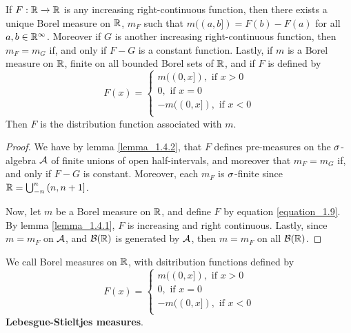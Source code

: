 \begin{theorem}\label{theorem_1.4.3}
    If $F:\mathbb{R} \xrightarrow{} \mathbb{R}$ is any increasing right-continuous function,
    then there exists a unique Borel measure on $\mathbb{R}$, $m_F$ such that
    $m((a,b])=F(b)-F(a)$ for all $a,b \in \mathbb{R}^\infty$. Moreover if $G$ is another
    increasing right-continuous function, then  $m_F=m_G$ if, and only if  $F-G$
    is a constant function. Lastly, if  $m$ is a Borel measure on  $\mathbb{R}$, finite
    on all bounded Borel sets of $\mathbb{R}$, and if $F$ is defined by
    \begin{equation}\label{equation_1.9}
        F(x)=\begin{cases}
                m((0,x]), \text{ if } x>0   \\
                0, \text{ if } x=0   \\
                -m((0,x]), \text{ if } x<0   \\
        \end{cases}
    \end{equation}
    Then $F$ is the distribution function associated with  $m$.
\end{theorem}
\begin{proof}
    We have by lemma \ref{lemma_1.4.2}, that $F$ defines pre-measures on the
    $\sigma$-algebra  $\mathcal{A}$ of finite unions of open half-intervals, and moreover
    that $m_F=m_G$ if, and only if $F-G$ is constant. Moreover, each $m_F$ is
    $\sigma$-finite since $\mathbb{R}=\bigcup_{-n}^n{(n,n+1]}$.

     Now, let $m$ be a Borel measure on  $\mathbb{R}$, and define  $F$ by equation
     \ref{equation_1.9}. By lemma \ref{lemma_1.4.1}, $F$ is increasing and right
     continuous. Lastly, since $m=m_F$ on  $\mathcal{A}$, and $\mathcal{B}(\mathbb{R})$ is generated by
     $\mathcal{A}$, then $m=m_F$ on all $\mathcal{B}(\mathbb{R})$.
\end{proof}

\begin{definition}
    We call Borel measures on $\mathbb{R}$, with dsitribution functions defined by
    \begin{equation*}
        F(x)=\begin{cases}
                m((0,x]), \text{ if } x>0   \\
                0, \text{ if } x=0   \\
                -m((0,x]), \text{ if } x<0   \\
        \end{cases}
    \end{equation*}
    \textbf{Lebesgue-Stieltjes measures}.
\end{definition}

